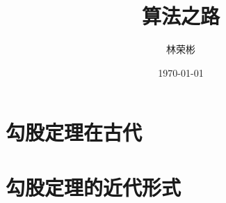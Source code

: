 \documentclass[UTF8]{ctexart}
\title{算法之路}
\author{林荣彬}
\date{\today}
\begin{document}
\maketitle
\tableofcontents
\section{勾股定理在古代}
\section{勾股定理的近代形式}

\end{document}
